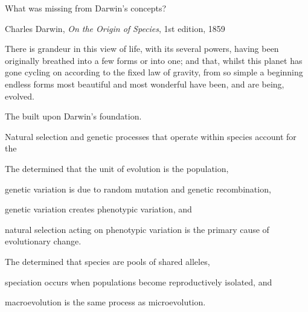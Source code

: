 \documentclass[t]{beamer}
\begin{document}

\begin{frame}[t]{What was missing from Darwin's concepts?}
\vspace{-\baselineskip}
\begin{multicols}{2}
\bigskip


\vspace{7\baselineskip}

Charles Darwin, \textit{On the Origin of Species}, 1st edition, 1859

	\columnbreak
	\begin{displayquote}There is grandeur in this view of life, with its several powers, having been originally breathed into a few forms or into one; and that, whilst this planet has gone cycling on according to the fixed law of gravity, from so simple a beginning endless forms most beautiful and most wonderful have been, and are being, evolved.\end{displayquote}
	
	
\end{multicols}
\end{frame}

\begin{frame}{The  built upon Darwin's foundation.}

\hangpara Natural selection and genetic processes that operate within species account for the 

\end{frame}

\begin{frame}[t]{The  determined that}
\hangpara the unit of evolution is the population,

\hangpara genetic variation is due to random mutation and genetic recombination,

\hangpara genetic variation creates phenotypic variation, and

\hangpara natural selection acting on phenotypic variation is the primary cause of evolutionary change.

\end{frame}

\begin{frame}[t]{The  determined that}
\hangpara species are pools of shared alleles, 

\hangpara speciation occurs when populations become reproductively isolated, and

\hangpara macroevolution is the same process as microevolution.


\end{frame}
\end{document}
